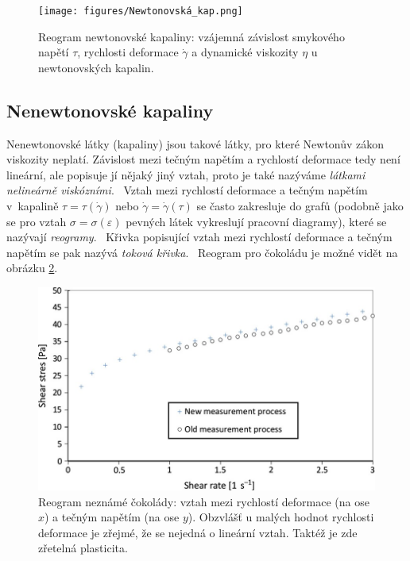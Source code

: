 \documentclass[12pt]{article}
\begin{document}
\begin{figure}
    \centering
    \texttt{[image: figures/Newtonovská\_kap.png]}
    \caption{Reogram newtonovské kapaliny: vzájemná závislost smykového napětí $\tau$, rychlosti deformace $\dot\gamma$ a dynamické viskozity $\eta$ u newtonovských kapalin.~\cite{thesis:Viskozimetr_pro_viskozni_materialy}}
    \label{fig:Newtonovská_kapalina}
\end{figure}

\subsection{Nenewtonovské kapaliny}%

Nenewtonovské látky (kapaliny) jsou takové látky, pro které Newtonův zákon viskozity neplatí. Závislost mezi tečným napětím a rychlostí deformace tedy není lineární, ale popisuje jí nějaký jiný vztah, proto je také nazýváme \emph{látkami nelineárně viskózními}.~\cite{wiki:Newtonská_tekutina}
Vztah mezi rychlostí deformace a tečným napětím v~kapalině $\tau = \tau(\dot\gamma)$ nebo $\dot\gamma = \dot\gamma(\tau)$ se často zakresluje do grafů (podobně jako se pro vztah $\sigma = \sigma(\varepsilon)$ pevných látek vykreslují pracovní diagramy), které se nazývají \emph{reogramy}.~\cite{material:Viskozita_a_povrchove_napeti} Křivka popisující vztah mezi rychlostí deformace a tečným napětím se pak nazývá \emph{toková křivka}.~\cite{material:Tokove_chovani_reologicke_modely} Reogram pro čokoládu je možné vidět na obrázku \ref{fig:diagram_cokolada}.

\begin{figure}
    \centering
    \includegraphics[width = 0.75\linewidth]{figures/diagram_viskozity_čokoláda.jpg}
    \caption{Reogram neznámé čokolády: vztah mezi rychlostí deformace (na ose $x$) a tečným napětím (na ose $y$). Obzvlášť u malých hodnot rychlosti deformace je zřejmé, že se nejedná o lineární vztah. Taktéž je zde zřetelná plasticita.~\cite{Figure:chocolate_shear_stress}}
    \label{fig:diagram_cokolada}
\end{figure}
\end{document}
